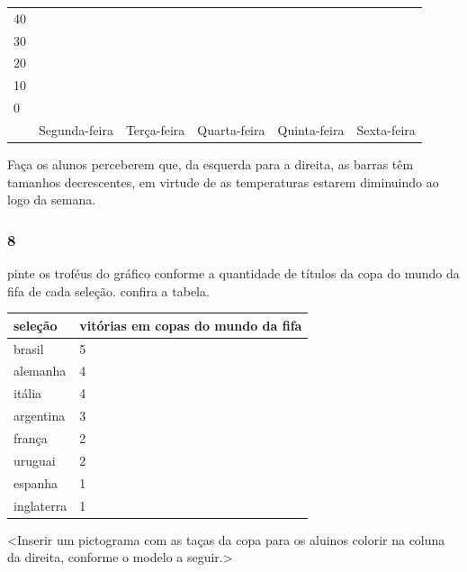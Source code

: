 \begin{longtable}[]{@{}llllll@{}}
\toprule
40 & & & & &\tabularnewline
30 & & & & &\tabularnewline
20 & & & & &\tabularnewline
10 & & & & &\tabularnewline
0 & & & & &\tabularnewline
& Segunda-feira & Terça-feira & Quarta-feira & Quinta-feira & Sexta-feira\tabularnewline
\bottomrule
\end{longtable}

Faça os alunos perceberem que, da esquerda para a direita, as barras têm
tamanhos decrescentes, em virtude de as temperaturas estarem diminuindo
ao logo da semana.

\subsubsection{8}\label{section-83}

pinte os troféus do gráfico conforme a quantidade de títulos da copa do
mundo da fifa de cada seleção. confira a tabela.

\begin{longtable}[]{@{}ll@{}}
\toprule
seleção & vitórias em copas do mundo da fifa\tabularnewline
\midrule
\endhead
brasil & 5\tabularnewline
alemanha & 4\tabularnewline
itália & 4\tabularnewline
argentina & 3\tabularnewline
frança & 2\tabularnewline
uruguai & 2\tabularnewline
espanha & 1\tabularnewline
inglaterra & 1\tabularnewline
\bottomrule
\end{longtable}

\textless{}Inserir um pictograma com as taças da copa para os aluinos
colorir na coluna da direita, conforme o modelo a seguir.\textgreater{}

